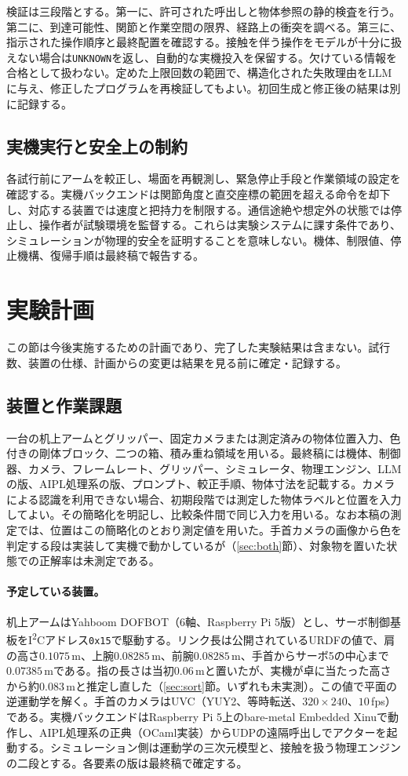 \documentclass[10pt,letterpaper]{article}
\begin{document}
検証は三段階とする。第一に、許可された呼出しと物体参照の静的検査を行う。第二に、到達可能性、関節と作業空間の限界、経路上の衝突を調べる。第三に、指示された操作順序と最終配置を確認する。接触を伴う操作をモデルが十分に扱えない場合は\texttt{UNKNOWN}を返し、自動的な実機投入を保留する。欠けている情報を合格として扱わない。定めた上限回数の範囲で、構造化された失敗理由をLLMに与え、修正したプログラムを再検証してもよい。初回生成と修正後の結果は別に記録する。

\subsection{実機実行と安全上の制約}
各試行前にアームを較正し、場面を再観測し、緊急停止手段と作業領域の設定を確認する。実機バックエンドは関節角度と直交座標の範囲を超える命令を却下し、対応する装置では速度と把持力を制限する。通信途絶や想定外の状態では停止し、操作者が試験環境を監督する。これらは実験システムに課す条件であり、シミュレーションが物理的安全を証明することを意味しない。機体、制限値、停止機構、復帰手順は最終稿で報告する。

\section{実験計画}\label{sec:protocol}
この節は今後実施するための計画であり、完了した実験結果は含まない。試行数、装置の仕様、計画からの変更は結果を見る前に確定・記録する。

\subsection{装置と作業課題}
一台の机上アームとグリッパー、固定カメラまたは測定済みの物体位置入力、色付きの剛体ブロック、二つの箱、積み重ね領域を用いる。最終稿には機体、制御器、カメラ、フレームレート、グリッパー、シミュレータ、物理エンジン、LLMの版、AIPL処理系の版、プロンプト、較正手順、物体寸法を記載する。カメラによる認識を利用できない場合、初期段階では測定した物体ラベルと位置を入力してよい。その簡略化を明記し、比較条件間で同じ入力を用いる。なお本稿の測定では、位置はこの簡略化のとおり測定値を用いた。手首カメラの画像から色を判定する段は実装して実機で動かしているが（\ref{sec:both}節）、対象物を置いた状態での正解率は未測定である。

\paragraph{予定している装置。}机上アームはYahboom DOFBOT（6軸、Raspberry Pi 5版）とし、サーボ制御基板をI\textsuperscript{2}Cアドレス\texttt{0x15}で駆動する。リンク長は公開されているURDFの値で、肩の高さ$0.1075$\,m、上腕$0.08285$\,m、前腕$0.08285$\,m、手首からサーボ5の中心まで$0.07385$\,mである。指の長さは当初$0.06$\,mと置いたが、実機が卓に当たった高さから約$0.083$\,mと推定し直した（\ref{sec:sort}節。いずれも未実測）。この値で平面の逆運動学を解く。手首のカメラはUVC（YUY2、等時転送、$320\times240$、$10$\,fps）である。実機バックエンドはRaspberry Pi 5上のbare-metal Embedded Xinuで動作し、AIPL処理系の正典（OCaml実装）からUDPの遠隔呼出しでアクターを起動する。シミュレーション側は運動学の三次元模型と、接触を扱う物理エンジンの二段とする。各要素の版は最終稿で確定する。
\end{document}
